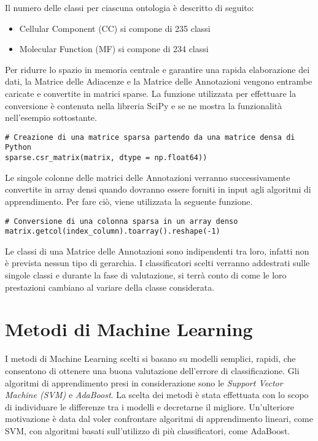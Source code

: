 \documentclass[12pt,a4paper,oneside,hidelinks]{report}
\begin{document}
Il numero delle classi per ciascuna ontologia è descritto di seguito:

\begin{itemize}
    \item Cellular Component (CC) si compone di 235 classi
    \item Molecular Function (MF) si compone di 234 classi
\end{itemize}
  
Per ridurre lo spazio in memoria centrale e garantire una rapida elaborazione dei dati, la Matrice delle Adiacenze e la Matrice delle Annotazioni vengono entrambe caricate e convertite in matrici sparse. La funzione utilizzata per effettuare la conversione è contenuta nella libreria SciPy e se ne mostra la funzionalità nell'esempio sottostante.

\lstset{style=customp}

\begin{lstlisting} 
# Creazione di una matrice sparsa partendo da una matrice densa di Python
sparse.csr_matrix(matrix, dtype = np.float64))
\end{lstlisting}

Le singole colonne delle matrici delle Annotazioni verranno successivamente convertite in array densi quando dovranno essere forniti in input agli algoritmi di apprendimento. Per fare ciò, viene utilizzata la seguente funzione.

\lstset{style=customp}

\begin{lstlisting} 
# Conversione di una colonna sparsa in un array denso
matrix.getcol(index_column).toarray().reshape(-1)
\end{lstlisting}

Le classi di una Matrice delle Annotazioni sono indipendenti tra loro, infatti non è prevista nessun tipo di gerarchia. I classificatori scelti verranno addestrati sulle singole classi e durante la fase di valutazione, si terrà conto di come le loro prestazioni cambiano al variare della classe considerata.

\chapter{Metodi di Machine Learning} 
\label{chap:metodi}

I metodi di Machine Learning scelti si basano su modelli semplici, rapidi, che consentono di ottenere una buona valutazione dell'errore di classificazione. Gli algoritmi di apprendimento presi in considerazione sono le \textit{Support Vector Machine (SVM)} e \textit{AdaBoost}. La scelta dei metodi è stata effettuata con lo scopo di individuare le differenze tra i modelli e decretarne il migliore. Un'ulteriore motivazione è data dal voler confrontare algoritmi di apprendimento lineari, come SVM, con algoritmi basati sull'utilizzo di più classificatori, come AdaBoost.
\end{document}

